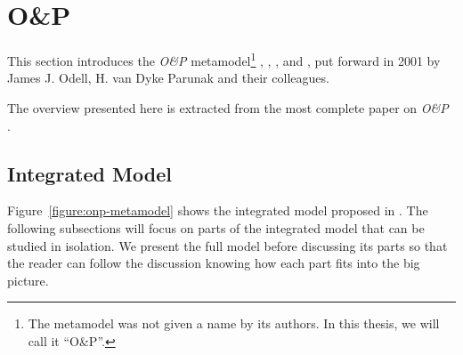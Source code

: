 
\section{O\&P}

This section introduces the \textit{O\&P} metamodel\footnote{The metamodel was not given a name by its authors. In this thesis, we will call it ``O\&P''.} \cite{Odell01}, \cite{Parunak02}, \cite{Odell03b}, \cite{Odell04b} and \cite{Odell05}, put forward in 2001 by James J. Odell, H. van Dyke Parunak and their colleagues.

The overview presented here is extracted from the most complete paper on \textit{O\&P} \cite{Odell05}.


\subsection{Integrated Model}

Figure~\ref{figure:onp-metamodel} shows the integrated model proposed in \cite{Odell05}.
The following subsections will focus on parts of the integrated model that can be studied in isolation.
We present the full model before discussing its parts so that the reader can follow the discussion knowing how each part fits into the big picture.

